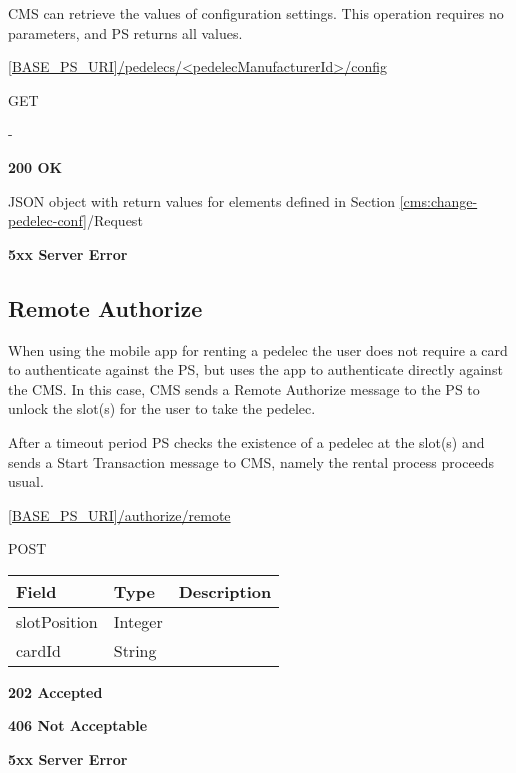\acs{CMS} can retrieve the values of configuration settings. This operation requires no parameters, and \acs{PS} returns all values.

 \url{[BASE_PS_URI]/pedelecs/<pedelecManufacturerId>/config}

 GET

 -

 \textbf{200 OK}

JSON object with return values for elements defined in Section \ref{cms:change-pedelec-conf}/Request

 \textbf{5xx Server Error}

\subsection{Remote Authorize}

When using the mobile app for renting a pedelec the user does not require a card to authenticate against the \acs{PS}, but uses the app to authenticate directly against the \acs{CMS}. In this case, \acs{CMS} sends a Remote Authorize message to the \acs{PS} to unlock the slot(s) for the user to take the pedelec. 

After a timeout period \acs{PS} checks the existence of a pedelec at the slot(s) and sends a Start Transaction message to \acs{CMS}, namely the rental process proceeds usual.


 \url{[BASE_PS_URI]/authorize/remote}

 POST

\begin{table}[!h]
\vspace{-7mm}
\begin{tabularx}{\linewidth}{ | l | l | X | }
  \hline
  \rowcolor{table-head}
  Field & Type & Description \\
  \hline
  slotPosition 	& Integer	&  \\
  cardId		& String &  \\
  \hline
\end{tabularx}
\end{table}

 \textbf{202 Accepted}

 \textbf{406 Not Acceptable}

\textbf{5xx Server Error}

